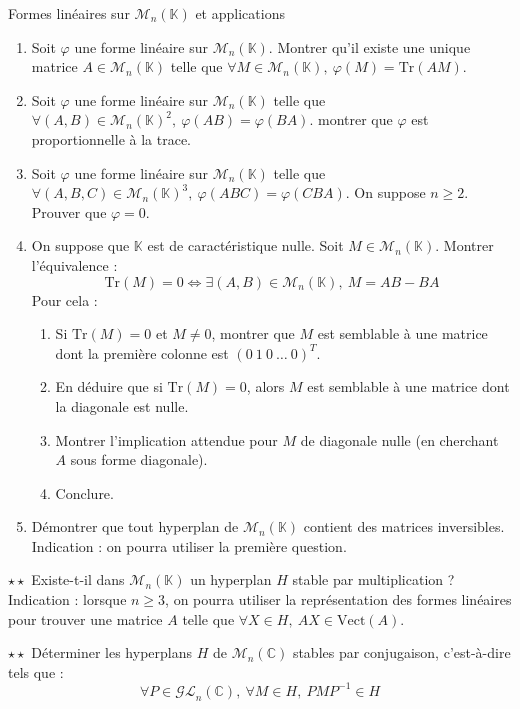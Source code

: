\documentclass[french,a4paper]{article}
\newcommand{\C}{\mathbb{C}}
\newcommand{\K}{\mathbb{K}}
\newcommand{\inv}{^{-1}}
\newcommand{\Tr}{\text{Tr}}
\theoremstyle{plain}
\theoremstyle{definition}
\theoremstyle{remark}
\begin{document}
\begin{ex}[Châteaux]{Formes linéaires sur $\mathcal{M}_n(\K)$ et applications}
	\begin{enumerate}
		\item Soit $\varphi$ une forme linéaire sur $\mathcal{M}_n(\K)$. Montrer qu'il existe une unique matrice $A\in\mathcal{M}_n(\K)$ telle que $\forall M\in\mathcal{M}_n(\K),\ \varphi(M)=\Tr(AM)$.
		\item Soit $\varphi$ une forme linéaire sur $\mathcal{M}_n(\K)$ telle que $\forall (A,B)\in\mathcal{M}_n(\K)^2,\ \varphi(AB)=\varphi(BA)$. montrer que $\varphi$ est proportionnelle à la trace.
		\item Soit $\varphi$ une forme linéaire sur $\mathcal{M}_n(\K)$ telle que $\forall(A,B,C)\in\mathcal{M}_n(\K)^3,\ \varphi(ABC)=\varphi(CBA)$. On suppose $n\geqslant 2$. Prouver que $\varphi=0$.
		\item On suppose que $\K$ est de caractéristique nulle. Soit $M\in\mathcal{M}_n(\K)$. Montrer l'équivalence : $$\Tr(M)=0\iff\exists(A,B)\in\mathcal{M}_n(\K),\ M=AB-BA$$ Pour cela : 
		\begin{enumerate}[label=\alph*.]
			\item Si $\Tr(M)=0$ et $M\ne 0$, montrer que $M$ est semblable à une matrice dont la première colonne est $(0\ 1\ 0\ \ldots\ 0)^T$.
			\item En déduire que si $\Tr(M)=0$, alors $M$ est semblable à une matrice dont la diagonale est nulle.
			\item Montrer l'implication attendue pour $M$ de diagonale nulle (en cherchant $A$ sous forme diagonale).
			\item Conclure.
		\end{enumerate}
		\item Démontrer que tout hyperplan de $\mathcal{M}_n(\K)$ contient des matrices inversibles. Indication : on pourra utiliser la première question.
	\end{enumerate}
\end{ex}

\begin{ex}{$\star\star$}
	Existe-t-il dans $\mathcal{M}_n(\K)$ un hyperplan $H$ stable par multiplication ? Indication : lorsque $n\geqslant3$, on pourra utiliser la représentation des formes linéaires pour trouver une matrice $A$ telle que $\forall X\in H,\ AX\in\text{Vect}(A)$.
\end{ex}

\begin{ex}{$\star\star$}
	Déterminer les hyperplans $H$ de $\mathcal{M}_n(\C)$ stables par conjugaison, c'est-à-dire tels que : $$\forall P\in\mathcal{GL}_n(\C),\ \forall M\in H,\ PMP\inv\in H$$
\end{ex}
\end{document}
